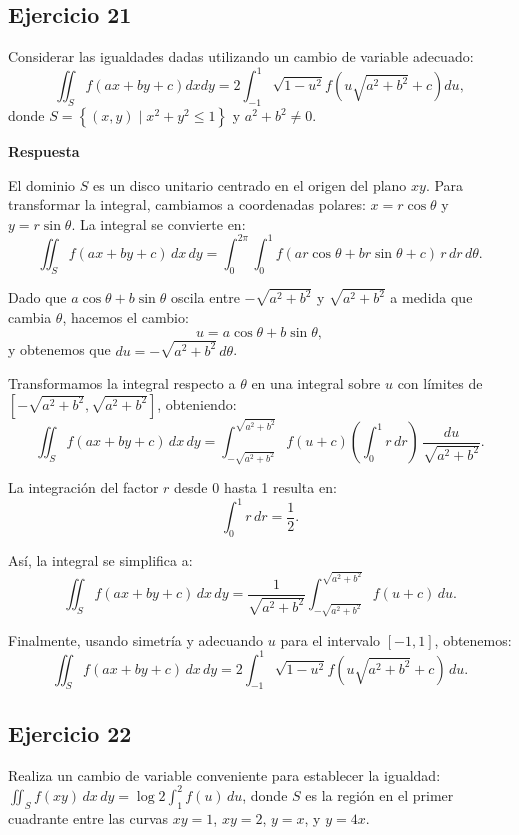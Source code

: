 \documentclass{report}
\begin{document}
\subsection{Ejercicio 21}
Considerar las igualdades dadas utilizando un cambio de variable adecuado:
\[
\iint_{S} f(a x+b y+c) d x d y=2 \int_{-1}^{1} \sqrt{1-u^{2}} f\left(u \sqrt{a^{2}+b^{2}}+c\right) d u,
\]
donde \( S=\left\{(x, y) \mid x^{2}+y^{2} \leq 1\right\} \) y \( a^{2}+b^{2} \neq 0 \).

\textbf{Respuesta}

El dominio \( S \) es un disco unitario centrado en el origen del plano \( xy \). Para transformar la integral, cambiamos a coordenadas polares: \( x = r \cos \theta \) y \( y = r \sin \theta \). La integral se convierte en:
\[
\iint_{S} f(a x + b y + c) \, dx \, dy = \int_{0}^{2\pi} \int_{0}^{1} f(a r \cos \theta + b r \sin \theta + c) \, r \, dr \, d\theta.
\]

Dado que \( a \cos \theta + b \sin \theta \) oscila entre \( -\sqrt{a^{2} + b^{2}} \) y \( \sqrt{a^{2} + b^{2}} \) a medida que cambia \( \theta \), hacemos el cambio:
\[
u = a \cos \theta + b \sin \theta,
\]
y obtenemos que \( du = -\sqrt{a^{2} + b^{2}} \, d\theta \).

Transformamos la integral respecto a \( \theta \) en una integral sobre \( u \) con límites de \( [-\sqrt{a^{2} + b^{2}}, \sqrt{a^{2} + b^{2}}] \), obteniendo:
\[
\iint_{S} f(a x + b y + c) \, dx \, dy = \int_{-\sqrt{a^{2} + b^{2}}}^{\sqrt{a^{2} + b^{2}}} f(u + c) \left( \int_{0}^{1} r \, dr \right) \, \frac{du}{\sqrt{a^{2} + b^{2}}}.
\]

La integración del factor \( r \) desde 0 hasta 1 resulta en:
\[
\int_{0}^{1} r \, dr = \frac{1}{2}.
\]

Así, la integral se simplifica a:
\[
\iint_{S} f(a x + b y + c) \, dx \, dy = \frac{1}{\sqrt{a^{2} + b^{2}}} \int_{-\sqrt{a^{2} + b^{2}}}^{\sqrt{a^{2} + b^{2}}} f(u + c) \, du.
\]

Finalmente, usando simetría y adecuando \( u \) para el intervalo \( [-1, 1] \), obtenemos:
\[
\iint_{S} f(a x + b y + c) \, dx \, dy = 2 \int_{-1}^{1} \sqrt{1 - u^{2}} f\left(u \sqrt{a^{2} + b^{2}} + c\right) \, du.
\]\subsection{Ejercicio 22}
Realiza un cambio de variable conveniente para establecer la igualdad: \(\iint_{S} f(x y) \, dx \, dy = \log 2 \int_{1}^{2} f(u) \, du\), donde \(S\) es la región en el primer cuadrante entre las curvas \(xy=1\), \(xy=2\), \(y=x\), y \(y=4x\).
\end{document}
